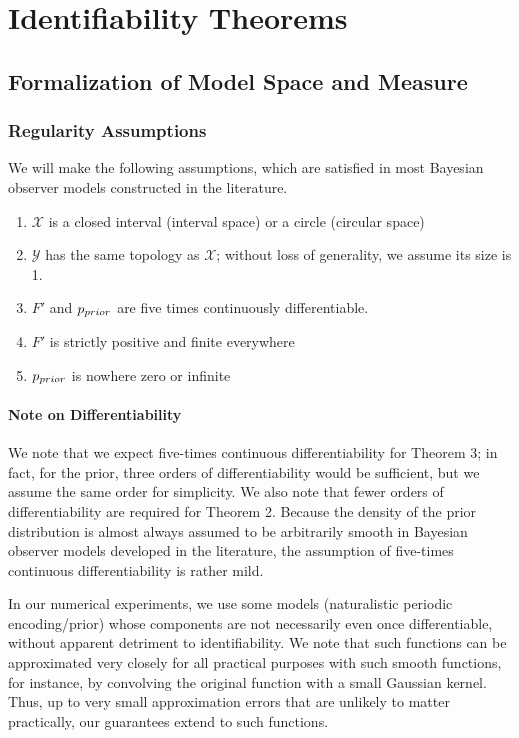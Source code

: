 



\section{Identifiability Theorems}

\subsection{Formalization of Model Space and Measure}
\label{sec:model-space-and-measure}


\subsubsection{Regularity Assumptions}\label{sec:basic-setup}

We will make the following assumptions, which are satisfied in most Bayesian observer models constructed in the literature.
\begin{enumerate}
\item $\mathcal{X}$ is a closed interval (interval space) or a circle (circular space)
\item $\mathcal{Y}$ has the same topology as $\mathcal{X}$; without loss of generality, we assume its size is 1.
    \item $F'$ and $p_{prior}$ are five times continuously differentiable.
    
    \item $F'$ is strictly positive and finite everywhere
    \item $p_{prior}$ is nowhere zero or infinite
\end{enumerate}

\paragraph*{Note on Differentiability}
We note that we expect five-times continuous differentiability for Theorem 3; in fact, for the prior, three orders of differentiability would be sufficient, but we assume the same order for simplicity.
We also note that fewer orders of differentiability are required for Theorem 2. Because the density of the prior distribution is almost always assumed to be arbitrarily smooth in Bayesian observer models developed in the literature, the assumption  of five-times continuous differentiability is rather mild.

In our numerical experiments, we use some models (naturalistic periodic encoding/prior) whose components are not necessarily even once differentiable, without apparent detriment to identifiability. We note that such functions can be approximated very closely for all practical purposes with such smooth functions, for instance, by convolving the original function with a small Gaussian kernel. Thus, up to very small approximation errors that are unlikely to matter practically, our guarantees extend to such functions.

